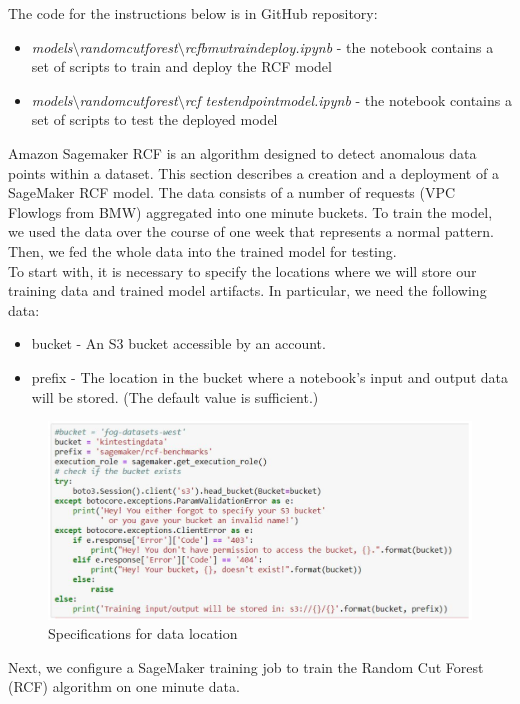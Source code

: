 The code for the instructions below is in GitHub repository:
\begin{itemize}
    \item \textit{models$\setminus$random\textunderscore cut\textunderscore forest$\setminus$rcf\textunderscore bmw\textunderscore train\textunderscore deploy.ipynb} - the notebook contains a set of scripts to train and deploy the RCF model
    \item \textit{models$\setminus$random\textunderscore cut\textunderscore forest$\setminus$rcf \textunderscore test\textunderscore endpoint\textunderscore model.ipynb} - the notebook contains a set of scripts to test the deployed model
\end{itemize}
Amazon Sagemaker RCF is an algorithm designed to detect anomalous data points within a dataset. 
This section describes a creation and a deployment of a SageMaker RCF model. 
The data consists of a number of requests (VPC Flowlogs from BMW) aggregated into one minute buckets. To train the model, we used the data over the course of one week that represents a normal pattern. Then, we fed the whole data into the trained model for testing.\\To start with, it is necessary to specify the locations where we will store our training data and trained model artifacts. In particular, we need the following data:
\begin{itemize}
    \item bucket - An S3 bucket accessible by an account.
    \item prefix - The location in the bucket where a notebook's input and output data will be stored. (The default value is sufficient.)
\end{itemize}
\begin{figure}[h]
    \centering
    \includegraphics[width=1\textwidth]{images/rcf-data-location.png}
    \caption{Specifications for data location}
    \label{fig:rcf_data_location}
\end{figure}
Next, we configure a SageMaker training job to train the Random Cut Forest (RCF) algorithm on one minute data.

